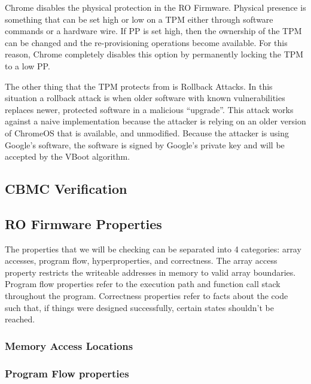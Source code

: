 \documentclass[../report.tex]{subfiles}
\begin{document}
Chrome disables the physical protection in the RO Firmware.
Physical presence is something that can be set high or low on a TPM either through software commands or a hardware wire. 
If PP is set high, then the ownership of the TPM can be changed and the re-provisioning operations become available.
For this reason, Chrome completely disables this option by permanently locking the TPM to a low PP\@.

The other thing that the TPM protects from is Rollback Attacks.
In this situation a rollback attack is when older software with known vulnerabilities replaces newer, protected software in a malicious ``upgrade''.
This attack works against a naive implementation because the attacker is relying on an older version of ChromeOS that is available, and unmodified.
Because the attacker is using Google's software, the software is signed by Google's private key and will be accepted by the VBoot algorithm.

\subsection{CBMC Verification}

\subsection{RO Firmware Properties}

The properties that we will be checking can be separated into 4 categories: array accesses, program flow, hyperproperties, and correctness.
The array access property restricts the writeable addresses in memory to valid array boundaries. 
Program flow properties refer to the execution path and function call stack throughout the program.
Correctness properties refer to facts about the code such that, if things were designed successfully, certain states shouldn't be reached.


\subsubsection{Memory Access Locations}

\subsubsection{Program Flow properties}
\end{document}
